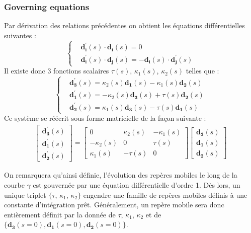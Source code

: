 \subsubsection{Governing equations}
Par dérivation des relations précédentes on obtient les équations différentielles suivantes :
\begin{equation}
\begin{cases}
&\mathbf{d_{i}^{'}}(s) \cdot \mathbf{d_{i}}(s) = 0 \\
&\mathbf{d_{i}^{'}}(s) \cdot \mathbf{d_{j}}(s) = -\mathbf{d_{i}}(s) \cdot \mathbf{d_{j}^{'}}(s)
\end{cases}
\end{equation}
Il existe donc 3 fonctions scalaires $\tau(s)$, $\kappa_{1}(s)$, $\kappa_{2}(s)$ telles que :
\begin{equation}
\begin{cases}
&\mathbf{d_{3}^{'}}(s) = \kappa_{2}(s)\mathbf{d_{1}}(s) - \kappa_{1}(s)\mathbf{d_{2}}(s) \\
&\mathbf{d_{1}^{'}}(s) = -\kappa_{2}(s)\mathbf{d_{3}}(s) + \tau(s)\mathbf{d_{2}}(s) \\
&\mathbf{d_{2}^{'}}(s) = \kappa_{1}(s)\mathbf{d_{3}}(s) - \tau(s)\mathbf{d_{1}}(s)
\end{cases}
\end{equation}
Ce système se réécrit sous forme matricielle de la façon suivante :
\begin{gather}
\left[\begin{array}{c}
\mathbf{d_{3}^{'}}(s) \\
\mathbf{d_{1}^{'}}(s) \\
\mathbf{d_{2}^{'}}(s)
\end{array}\right]
=
\left[\begin{array}{ccc}
0 & \kappa_{2}(s) & -\kappa_{1}(s) \\
-\kappa_{2}(s) & 0 & \tau(s) \\
\kappa_{1}(s) & -\tau(s) & 0
\end{array}\right]
\left[\begin{array}{c}
\mathbf{d_{3}}(s) \\
\mathbf{d_{1}}(s) \\
\mathbf{d_{2}}(s)
\end{array}\right]
\end{gather}

On remarquera qu'ainsi définie, l'évolution des repères mobiles le long de la courbe $\gamma$ est gouvernée par une équation différentielle d'ordre 1. Dès lors, un unique triplet $\{\tau$, $\kappa_{1}$, $\kappa_{2}\}$  engendre une famille de repères mobiles définis à une constante d'intégration prêt. Généralement, un repère mobile sera donc entièrement définit par la donnée de $\tau$, $\kappa_{1}$, $\kappa_{2}$ et de $\{\mathbf{d_{3}}(s=0),\mathbf{d_{1}}(s=0),\mathbf{d_{2}}(s=0) \}$.

